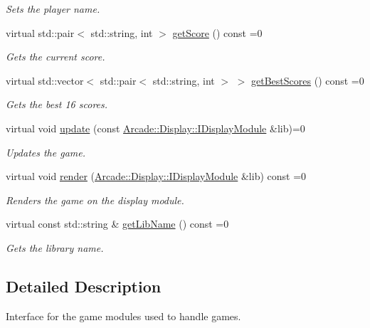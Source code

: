 \begin{DoxyCompactItemize}
\begin{DoxyCompactList}\small\item\em Sets the player name. \end{DoxyCompactList}\item 
virtual std\+::pair$<$ std\+::string, int $>$ \mbox{\hyperlink{classArcade_1_1Games_1_1IGameModule_ad84a0b04bb998a4eb3682c76d0fababf}{get\+Score}} () const =0
\begin{DoxyCompactList}\small\item\em Gets the current score. \end{DoxyCompactList}\item 
virtual std\+::vector$<$ std\+::pair$<$ std\+::string, int $>$ $>$ \mbox{\hyperlink{classArcade_1_1Games_1_1IGameModule_afaec4931b0051ba589fbe1b14d20131b}{get\+Best\+Scores}} () const =0
\begin{DoxyCompactList}\small\item\em Gets the best 16 scores. \end{DoxyCompactList}\item 
virtual void \mbox{\hyperlink{classArcade_1_1Games_1_1IGameModule_a421d1064fcc112dfc7ea025fc7f88aa7}{update}} (const \mbox{\hyperlink{classArcade_1_1Display_1_1IDisplayModule}{Arcade\+::\+Display\+::\+I\+Display\+Module}} \&lib)=0
\begin{DoxyCompactList}\small\item\em Updates the game. \end{DoxyCompactList}\item 
virtual void \mbox{\hyperlink{classArcade_1_1Games_1_1IGameModule_afd5ec66681e77038e3d4dc17f43e1ee9}{render}} (\mbox{\hyperlink{classArcade_1_1Display_1_1IDisplayModule}{Arcade\+::\+Display\+::\+I\+Display\+Module}} \&lib) const =0
\begin{DoxyCompactList}\small\item\em Renders the game on the display module. \end{DoxyCompactList}\item 
virtual const std\+::string \& \mbox{\hyperlink{classArcade_1_1Games_1_1IGameModule_a30966cbaa00abbd2a211cf152ea595f2}{get\+Lib\+Name}} () const =0
\begin{DoxyCompactList}\small\item\em Gets the library name. \end{DoxyCompactList}\end{DoxyCompactItemize}


\subsection{Detailed Description}
Interface for the game modules used to handle games. 

